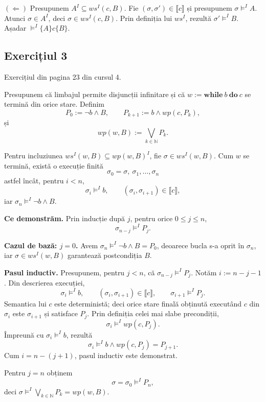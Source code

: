 \textbf{$(\Leftarrow)$}
Presupunem $A^I\subseteq ws^I(c,B)$. Fie
$(\sigma,\sigma')\in\llbracket c\rrbracket$ și presupunem
$\sigma\models^I A$. Atunci $\sigma\in A^I$, deci
$\sigma\in ws^I(c,B)$. Prin definiția lui $ws^I$, rezultă
$\sigma'\models^I B$. Așadar $\models^I\{A\}c\{B\}$.


\subsection{Exercițiul 3}
Exercițiul din pagina 23 din cursul 4.

Presupunem că limbajul permite disjuncții infinitare și că
$w:=\mathbf{while}\ b\ \mathbf{do}\ c$ se termină din orice stare. Definim
\[
	P_0:=\neg b\land B,\qquad
	P_{k+1}:=b\land wp(c,P_k),
\]
și
\[
	wp(w,B):=\bigvee_{k\in\mathbb N}P_k.
\]

Pentru incluziunea $ws^I(w,B)\subseteq wp(w,B)^I$, fie
$\sigma\in ws^I(w,B)$. Cum $w$ se termină, există o execuție finită
\[
	\sigma_0=\sigma,\ \sigma_1,\ldots,\sigma_n
\]
astfel încât, pentru $i<n$,
\[
	\sigma_i\models^I b,\qquad
	(\sigma_i,\sigma_{i+1})\in\llbracket c\rrbracket,
\]
iar $\sigma_n\models^I\neg b\land B$.

\textbf{Ce demonstrăm.}
Prin inducție după $j$, pentru orice $0\leq j\leq n$,
\[
	\sigma_{n-j}\models^I P_j.
\]

\textbf{Cazul de bază: $j=0$.}
Avem $\sigma_n\models^I\neg b\land B=P_0$, deoarece bucla s-a oprit în
$\sigma_n$, iar $\sigma\in ws^I(w,B)$ garantează postcondiția $B$.

\textbf{Pasul inductiv.}
Presupunem, pentru $j<n$, că
$\sigma_{n-j}\models^I P_j$. Notăm $i:=n-j-1$. Din descrierea execuției,
\[
	\sigma_i\models^I b,\qquad
	(\sigma_i,\sigma_{i+1})\in\llbracket c\rrbracket,
	\qquad \sigma_{i+1}\models^I P_j.
\]
Semantica lui $c$ este deterministă; deci orice stare finală obținută
executând $c$ din $\sigma_i$ este $\sigma_{i+1}$ și satisface $P_j$.
Prin definiția celei mai slabe precondiții,
\[
	\sigma_i\models^I wp(c,P_j).
\]
Împreună cu $\sigma_i\models^I b$, rezultă
\[
	\sigma_i\models^I b\land wp(c,P_j)=P_{j+1}.
\]
Cum $i=n-(j+1)$, pasul inductiv este demonstrat.

Pentru $j=n$ obținem
\[
	\sigma=\sigma_0\models^I P_n,
\]
deci $\sigma\models^I\bigvee_{k\in\mathbb N}P_k=wp(w,B)$.
